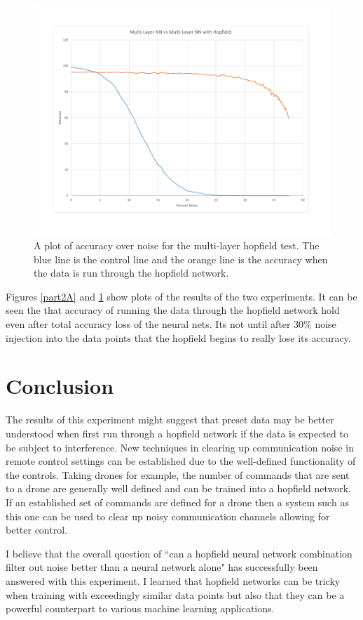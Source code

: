 \documentclass{IEEEtran}
\begin{document}
			\begin{figure}
				\centering
				\includegraphics[width=\linewidth]{MultiLayerHop.pdf}
				\caption{A plot of accuracy over noise for the multi-layer hopfield test. The blue line is the control line and the orange line is the accuracy when the data is run through the hopfield network.}
				\label{part2B}
			\end{figure}
			
			Figures \ref{part2A} and \ref{part2B} show plots of the results of the two experiments. It can be seen the that accuracy of running the data through the hopfield network hold even after total accuracy loss of the neural nets. Its not until after 30\% noise injection into the data points that the hopfield begins to really lose its accuracy. 			
			
	\section{Conclusion}
		The results of this experiment might suggest that preset data may be better understood when first run through a hopfield network if the data is expected to be subject to interference. New techniques in clearing up communication noise in remote control settings can be established due to the well-defined functionality of the controls. Taking drones for example, the number of commands that are sent to a drone are generally well defined and can be trained into a hopfield network. If an established set of commands are defined for a drone then a system such as this one can be used to clear up noisy communication channels allowing for better control. 
		
		I believe that the overall question of ``can a hopfield neural network combination filter out noise better than a neural network alone" has successfully been answered with this experiment. I learned that hopfield networks can be tricky when training with exceedingly similar data points but also that they can be a powerful counterpart to various machine learning applications.
	
	
	
\end{document}

